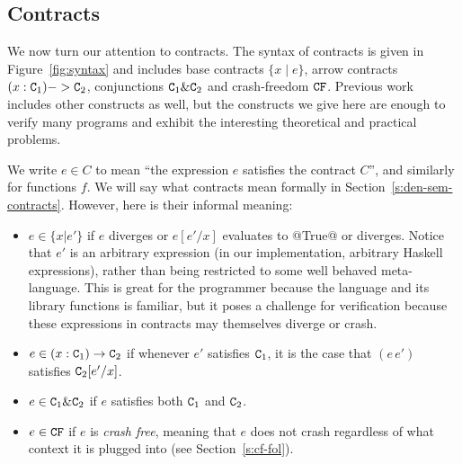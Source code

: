 \subsection{Contracts}


We now turn our attention to contracts. The syntax of contracts
is given in Figure~\ref{fig:syntax} and includes base contracts
$\{ x \mid e \}$, arrow contracts $(x : {\tt C}_1) -> {\tt C}_2$, conjunctions
${\tt C}_1 \& {\tt C}_2$ and crash-freedom ${\tt CF}$. Previous work~\cite{xu+:contracts}
includes other constructs as well, but the constructs we give here are enough to verify
many programs and exhibit the interesting theoretical and practical problems.

We write $e \in C$ to mean ``the expression $e$ satisfies the contract $C$'', and similarly
for functions $f$.  We will say what contracts mean formally in
Section~\ref{s:den-sem-contracts}.  However, here is their informal meaning:
\begin{itemize}
\item $e \in \{x | e'\}$ if $e$ diverges or $e[e'/x]$ evaluates to @True@ or diverges.
Notice that $e'$ is an arbitrary expression
(in our implementation, arbitrary Haskell expressions),
rather than being restricted to some well behaved meta-language.  This
is great for the programmer because the language and its library
functions is familiar, but it poses a challenge for verification
because these expressions in contracts may themselves diverge or
crash.
\item $e \in (x:{\tt C}_1) \rightarrow {\tt C}_2$ if whenever $e'$ satisfies ${\tt C}_1$, it
is the case that $(e\,e')$ satisfies ${\tt C}_2[e'/x]$.
\item $e \in {\tt C}_1 \& {\tt C}_2$ if $e$ satisfies both ${\tt C}_1$ and ${\tt C}_2$.
\item $e \in {\tt CF}$ if $e$ is \emph{crash free}, meaning that $e$ does not
crash regardless of what context it is plugged into (see Section~\ref{s:cf-fol}).
\end{itemize}

